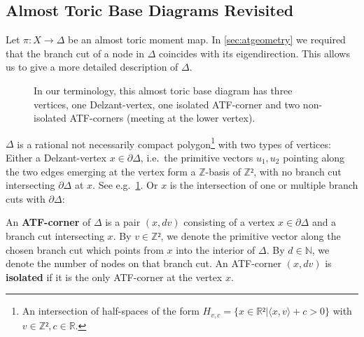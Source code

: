 \documentclass[12pt,a4paper,abstract=true,final]{scrartcl}
\begin{document}
\subsection{Almost Toric Base Diagrams Revisited}
\label{sec:atf_base_diagrams}

Let $π:X → Δ$ be an almost toric moment map.
In \cref{sec:atgeometry} we required that the branch cut of a node in $Δ$ coincides with its eigendirection.
This allows us to give a more detailed description of $Δ$.

\begin{figure}
  \centering
  \caption{In our terminology, this almost toric base diagram has three vertices, one Delzant-vertex, one isolated ATF-corner and two non-isolated ATF-corners (meeting at the lower vertex).}
  \label{fig:atf_example2}
\end{figure}

$Δ$ is a rational not necessarily compact polygon\footnote{An intersection of half-spaces of the form $H_{v,c} = \{x ∈ ℝ² | ⟨x,v⟩+c > 0\}$ with $v ∈ ℤ², c ∈ ℝ$.} with two types of vertices: Either a Delzant-vertex $x ∈ ∂Δ$, i.e.\ the primitive vectors $u_1,u_2$ pointing along the two edges emerging at the vertex form a $ℤ$-basis of $ℤ²$, with no branch cut intersecting $∂Δ$ at $x$. See e.g.\ \cref{fig:atf_example2}.
Or $x$ is the intersection of one or multiple branch cuts with $∂Δ$:

\begin{definition}
  \label{def:atf_corner}
  An \textbf{ATF-corner} of $Δ$ is a pair $(x,dv)$ consisting of a vertex $x ∈ ∂Δ$ and a branch cut intersecting $x$.
  By $v ∈ ℤ²$, we denote the primitive vector along the chosen branch cut which points from $x$ into the interior of $\Delta$.
  By $d \in \mathbb{N}$, we denote the number of nodes on that branch cut.
An ATF-corner $(x,dv)$ is \textbf{isolated} if it is the only ATF-corner at the vertex $x$. 
\end{definition}
\end{document}
